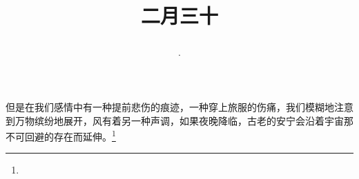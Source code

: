 \title{\date[d=8,m=4,y=2024][year:cn-y,年,month:cn,day:cn,日,·,weekday]·二月三十 }
但是在我们感情中有一种提前悲伤的痕迹，一种穿上旅服的伤痛，我们模糊地注意到万物缤纷地展开，风有着另一种声调，如果夜晚降临，古老的安宁会沿着宇宙那不可回避的存在而延伸。\footnote{ }

